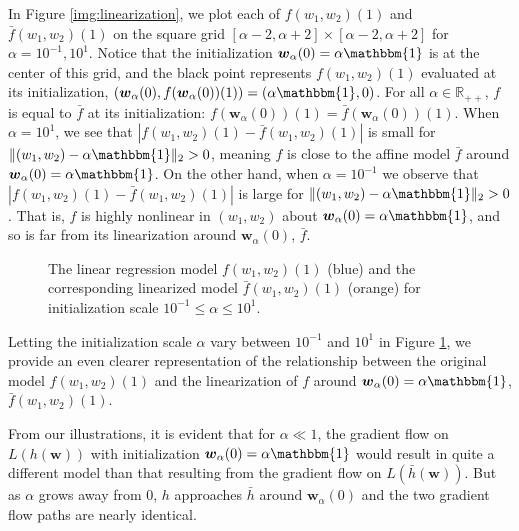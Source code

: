 \documentclass{article}
\begin{document}
In Figure \ref{img:linearization}, we plot each of $f(w_1, w_2)(1)$ and $\bar{f}(w_1, w_2)(1)$ on the square grid $[\alpha - 2, \alpha + 2] \times [\alpha - 2, \alpha + 2]$ for $\alpha = 10^{-1}, 10^1$. Notice that the initialization $\boldsymbol{w}_{\alpha}(0) = \alpha \mathbbm{1}$ is at the center of this grid, and the black point represents $f(w_1, w_2)(1)$ evaluated at its initialization, $(\boldsymbol{w}_{\alpha}(0), f(\boldsymbol{w}_{\alpha}(0))(1)) = (\alpha \mathbbm{1}, 0)$. For all $\alpha \in \mathbb{R}_{++}$, $f$ is equal to $\bar{f}$ at its initialization: $f(\boldsymbol{w}_{\alpha}(0))(1) = \bar{f}(\boldsymbol{w}_{\alpha}(0))(1)$. When $\alpha = 10^1$, we see that $|f(w_1, w_2)(1) - \bar{f}(w_1, w_2)(1) |$ is small for $\| (w_1, w_2) - \alpha \mathbbm{1} \|_2 > 0$, meaning $f$ is close to the affine model $\bar{f}$ around $\boldsymbol{w}_{\alpha}(0) = \alpha \mathbbm{1}$. On the other hand, when $\alpha = 10^{-1}$ we observe that $|f(w_1, w_2)(1) - \bar{f}(w_1, w_2)(1)|$ is large for $\| (w_1, w_2) - \alpha \mathbbm{1} \|_2 > 0$. That is, $f$ is highly nonlinear in $(w_1, w_2)$ about $\boldsymbol{w}_{\alpha}(0) = \alpha \mathbbm{1}$, and so is far from its linearization around $\boldsymbol{w}_{\alpha}(0)$, $\bar{f}$.

\begin{figure}[H]
\caption{The linear regression model $f(w_1, w_2)(1)$ (blue) and the corresponding linearized model $\bar{f}(w_1, w_2)(1)$ (orange) for initialization scale $10^{-1} \leq \alpha \leq 10^1$.}\label{gif:linearization}
\end{figure}

Letting the initialization scale $\alpha$ vary between $10^{-1}$ and $10^{1}$ in Figure \ref{gif:linearization}, we provide an even clearer representation of the relationship between the original model $f(w_1, w_2)(1)$ and the linearization of $f$ around $\boldsymbol{w}_{\alpha}(0) = \alpha \mathbbm{1}$, $\bar{f}(w_1, w_2)(1)$. %

From our illustrations, it is evident that for $\alpha \ll 1$, the gradient flow on $L(h(\boldsymbol{w}))$ with initialization $\boldsymbol{w}_{\alpha}(0) = \alpha \mathbbm{1}$ would result in quite a different model than that resulting from the gradient flow on $L(\bar{h}(\boldsymbol{w}))$. But as $\alpha$ grows away from $0$, $h$ approaches $\bar{h}$ around $\boldsymbol{w}_{\alpha}(0)$ and the two gradient flow paths are nearly identical.
\end{document}
